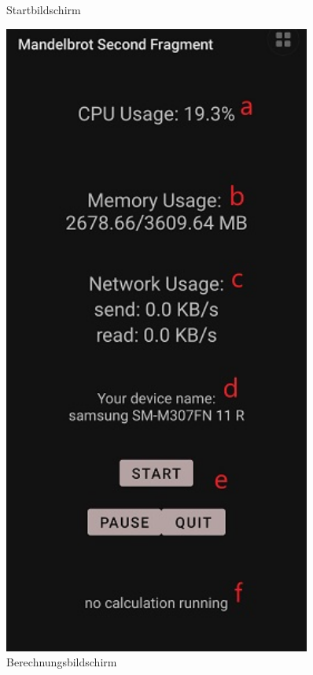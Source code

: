 \documentclass[12pt, onecolumn, notitlepage]{scrartcl}
\begin{document}
\begin{figure}[H]
\begin{minipage}[b]{.4\linewidth}
		\caption{Startbildschirm}
	\end{minipage}
	\hspace{.1\linewidth}
	\begin{minipage}[b]{.4\linewidth}
		\centering
		\includegraphics[height=0.5\textheight, width=0.9\textwidth]{calc_screen.jpg}
		\caption{Berechnungsbildschirm}
	\end{minipage}
\end{figure}
\end{document}
